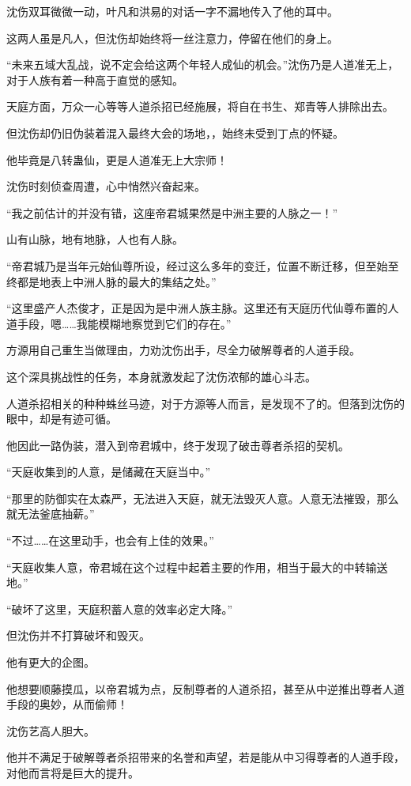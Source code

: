 \begin{this_body}
沈伤双耳微微一动，叶凡和洪易的对话一字不漏地传入了他的耳中。

这两人虽是凡人，但沈伤却始终将一丝注意力，停留在他们的身上。

“未来五域大乱战，说不定会给这两个年轻人成仙的机会。”沈伤乃是人道准无上，对于人族有着一种高于直觉的感知。

天庭方面，万众一心等等人道杀招已经施展，将自在书生、郑青等人排除出去。

但沈伤却仍旧伪装着混入最终大会的场地，，始终未受到丁点的怀疑。

他毕竟是八转蛊仙，更是人道准无上大宗师！

沈伤时刻侦查周遭，心中悄然兴奋起来。

“我之前估计的并没有错，这座帝君城果然是中洲主要的人脉之一！”

山有山脉，地有地脉，人也有人脉。

“帝君城乃是当年元始仙尊所设，经过这么多年的变迁，位置不断迁移，但至始至终都是地表上中洲人脉的最大的集结之处。”

“这里盛产人杰俊才，正是因为是中洲人族主脉。这里还有天庭历代仙尊布置的人道手段，嗯……我能模糊地察觉到它们的存在。”

方源用自己重生当做理由，力劝沈伤出手，尽全力破解尊者的人道手段。

这个深具挑战性的任务，本身就激发起了沈伤浓郁的雄心斗志。

人道杀招相关的种种蛛丝马迹，对于方源等人而言，是发现不了的。但落到沈伤的眼中，却是有迹可循。

他因此一路伪装，潜入到帝君城中，终于发现了破击尊者杀招的契机。

“天庭收集到的人意，是储藏在天庭当中。”

“那里的防御实在太森严，无法进入天庭，就无法毁灭人意。人意无法摧毁，那么就无法釜底抽薪。”

“不过……在这里动手，也会有上佳的效果。”

“天庭收集人意，帝君城在这个过程中起着主要的作用，相当于最大的中转输送地。”

“破坏了这里，天庭积蓄人意的效率必定大降。”

但沈伤并不打算破坏和毁灭。

他有更大的企图。

他想要顺藤摸瓜，以帝君城为点，反制尊者的人道杀招，甚至从中逆推出尊者人道手段的奥妙，从而偷师！

沈伤艺高人胆大。

他并不满足于破解尊者杀招带来的名誉和声望，若是能从中习得尊者的人道手段，对他而言将是巨大的提升。


\end{this_body}
